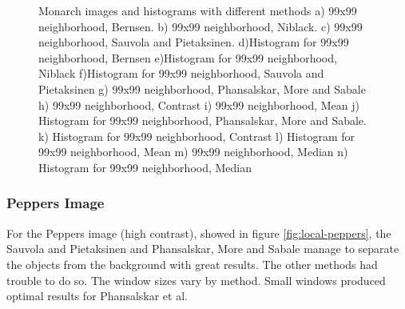 \documentclass[]{IEEEtran}
\begin{document}
\begin{figure}[h]
  \caption{Monarch images and histograms with different methods a) 99x99 neighborhood, Bernsen. b) 99x99 neighborhood, Niblack. c) 99x99 neighborhood, Sauvola and Pietaksinen. d)Histogram for 99x99 neighborhood, Bernsen e)Histogram for 99x99 neighborhood, Niblack f)Histogram for 99x99 neighborhood, Sauvola and Pietaksinen g) 99x99 neighborhood, Phansalskar, More and Sabale h) 99x99 neighborhood, Contrast i) 99x99 neighborhood, Mean j) Histogram for 99x99 neighborhood, Phansalskar, More and Sabale. k) Histogram for 99x99 neighborhood, Contrast l) Histogram for 99x99 neighborhood, Mean m) 99x99 neighborhood, Median n) Histogram for 99x99 neighborhood, Median}
  \label{fig:local-monarch}
\end{figure}

\subsubsection{Peppers Image}
For the Peppers image (high contrast), showed in figure \ref{fig:local-peppers}, the Sauvola and Pietaksinen and Phansalskar, More and Sabale manage to separate the objects from the background with great results. The other methods had trouble to do so. The window sizes vary by method. Small windows produced optimal results for Phansalskar et al.
\end{document}
